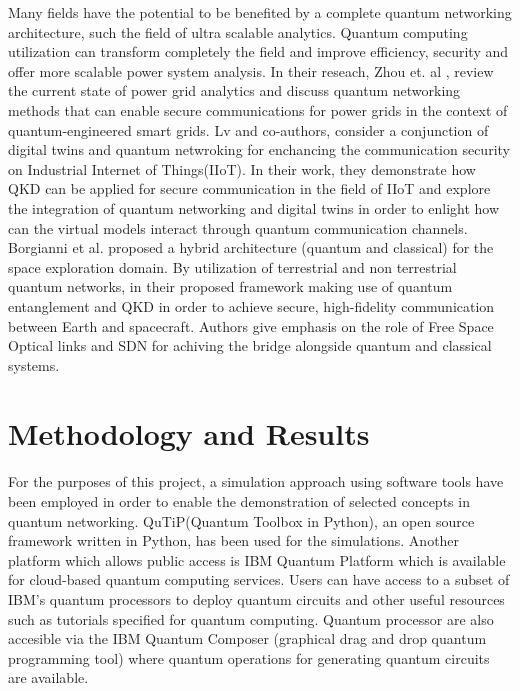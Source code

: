 \documentclass[12pt]{ieeetj}
\begin{document}
		Many fields have the potential to be benefited by a complete quantum networking architecture, 
		such the field of ultra scalable analytics. Quantum computing utilization can transform completely
		the field and improve efficiency, security and offer more scalable power system analysis.
		In their reseach, Zhou et. al \cite{powergrid}, review the current state of power grid analytics 
		and discuss quantum networking methods that can enable secure communications for power grids 
		in the context of quantum-engineered smart grids.
		Lv and co-authors\cite{digital-twins}, consider a conjunction of digital twins and quantum netwroking for enchancing the
		communication security on Industrial Internet of Things(IIoT). In their work, they demonstrate how QKD can be applied
		for secure communication in the field of IIoT and explore the integration of quantum networking and digital twins in order
		to enlight how can the virtual models interact through quantum communication channels.
		Borgianni et al.\cite{space} proposed a hybrid architecture (quantum and classical) for the space exploration domain. 
		By utilization of terrestrial and non terrestrial quantum networks, 
		in their proposed framework making use of quantum entanglement and QKD in order to achieve secure,
		high-fidelity communication between Earth and spacecraft. 
		Authors give emphasis on the role of Free Space Optical links and SDN for achiving the 
		bridge alongside quantum and classical systems.

	\section{Methodology and Results}
		
		For the purposes of this project, a
		simulation approach using software tools
		have been employed in order to enable the
		demonstration of selected concepts in quantum networking.
		QuTiP(Quantum Toolbox in Python)\cite{qutip}, an open source framework
		written in Python, has been used for the simulations.
		Another platform which allows public access is IBM Quantum Platform\cite{qiskit} which is available for cloud-based quantum computing services. 
		Users can have access to a subset of IBM's quantum processors to deploy quantum circuits 
		and other useful resources such as tutorials specified for quantum computing. Quantum processor are also accesible via the
		IBM Quantum Composer (graphical drag and drop quantum programming tool) where quantum operations for generating quantum circuits 
		are available.
\end{document}

